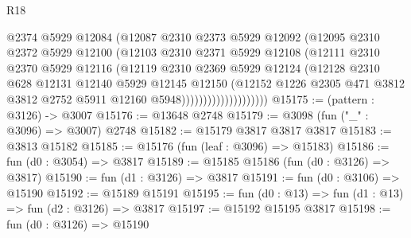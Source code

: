 \begin{lexlean}{R18}
\begin{coremodule}
                              @2374
                              @5929
                              @12084
                              (@12087
                                @2310
                                @2373
                                @5929
                                @12092
                                (@12095
                                  @2310
                                  @2372
                                  @5929
                                  @12100
                                  (@12103
                                    @2310
                                    @2371
                                    @5929
                                    @12108
                                    (@12111
                                      @2310
                                      @2370
                                      @5929
                                      @12116
                                      (@12119
                                        @2310
                                        @2369
                                        @5929
                                        @12124
                                        (@12128
                                          @2310
                                          @628
                                          @12131
                                          @12140
                                          @5929
                                          @12145
                                          @12150
                                          (@12152
                                            @1226
                                            @2305
                                            @471
                                            @3812
                                            @3812
                                            @2752
                                            @5911
                                            @12160
                                            @5948))))))))))))))))))))
@15175 := (pattern : @3126) -> @3007
@15176 := @13648 @2748
@15179 := @3098 (fun ("_" : @3096) => @3007) @2748
@15182 := @15179 @3817 @3817 @3817
@15183 := @3813 @15182
@15185 := @15176 (fun (leaf : @3096) => @15183)
@15186 := fun (d0 : @3054) => @3817
@15189 := @15185 @15186 (fun (d0 : @3126) => @3817)
@15190 := fun (d1 : @3126) => @3817
@15191 := fun (d0 : @3106) => @15190
@15192 := @15189 @15191
@15195 := fun (d0 : @13) => fun (d1 : @13) => fun (d2 : @3126) => @3817
@15197 := @15192 @15195 @3817
@15198 := fun (d0 : @3126) => @15190

\end{coremodule}
\end{lexlean}
